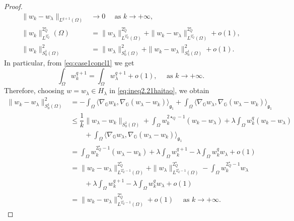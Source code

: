 \documentclass[11pt]{amsart}
\numberwithin{equation}{section} %
\theoremstyle{definition}
\begin{document}
\begin{proof}
%
\begin{align}
	\|w_k - w_\lambda\|_{L^{q+1}(\Omega)} &\to 0 \quad \textrm{ as } k \to +\infty, \label{eq:case1concl1}\\
	\|w_k\|^{2^\star_Q}_{L^{2^\star_Q}}(\Omega)&=\|w_\lambda\|_{L^{2^\star_Q}(\Omega)}^{2^\star_Q}+
	\|w_k-w_\lambda\|_{L^{2^\star_Q}(\Omega)}^{2^\star_Q}+o(1),\\
	\|w_k\|_{S^{1}_{0}(\Omega)}^2&=\|w_\lambda\|_{S^{1}_{0}(\Omega)}^2+\|w_k-w_\lambda\|_{S^{1}_{0}(\Omega)}^2+o(1).\label{eq:case1concl2}
\end{align}
In particular, from \eqref{eq:case1concl1} we get
\begin{equation}\label{eq:case1concl1bis}
	\int_\Omega w_k^{q+1}=\int_\Omega w_\lambda^{q+1}+o(1), \quad \textrm{ as } k \to +\infty. 
\end{equation}
%
%
Therefore, choosing $w=w_\lambda \in H_\lambda$ in \eqref{eq:ineq2.21haitao}, we obtain
\begin{equation}
	\begin{aligned}
		\|w_k - w_{\lambda}\|_{S^{1}_{0}(\Omega)}^2 &= -\int_{\Omega} \langle \nabla_{\mathbb{G}}w_k, \nabla_{\mathbb{G}}(w_{\lambda}-w_{k})\rangle_{\mathfrak{g}_1} + \int_{\Omega} \langle \nabla_{\mathbb{G}}w_{\lambda}, \nabla_{\mathbb{G}}(w_{\lambda}-w_{k})\rangle_{\mathfrak{g}_1}\\
		&\leq \dfrac{1}{k}\|w_{\lambda}-w_{k}\|_{S^{1}_{0}(\Omega)} + \int_{\Omega}w_{k}^{2\star_{Q}-1}(w_k - w_{\lambda}) + \lambda \int_{\Omega}w_{k}^{q}(w_k - w_{\lambda})\\
		&\qquad + \int_{\Omega} \langle \nabla_{\mathbb{G}}w_{\lambda}, \nabla_{\mathbb{G}}(w_{\lambda}-w_{k})\rangle_{\mathfrak{g}_1}\\
		&=\int_{\Omega}w_{k}^{2^{\star}_{Q}-1}(w_{\lambda}-w_k) + \lambda \int_{\Omega}w_{k}^{q+1} - \lambda \int_{\Omega}w_{k}^{q}w_{\lambda} +o(1)\\
		&=\|w_k-w_{\lambda}\|^{2^{\star}_{Q}}_{L^{2^{\star}_{Q}-1}(\Omega)} + \|w_{\lambda}\|^{2^{\star}_{Q}}_{L^{2^{\star}_{Q}-1}(\Omega)}-\int_{\Omega}w_{k}^{2^{\star}_{Q}-1}w_{\lambda} \\
		&\qquad + \lambda \int_{\Omega}w_{k}^{q+1} - \lambda \int_{\Omega}w_{k}^{q}w_{\lambda} +o(1)\\
		&=\|w_k-w_{\lambda}\|^{2^{\star}_{Q}}_{L^{2^{\star}_{Q}-1}(\Omega)} + o(1) \quad \textrm{ as } k \to +\infty.
	\end{aligned}
\end{equation}



\end{proof}
\end{document}

